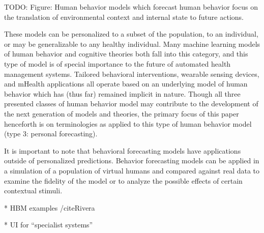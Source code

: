 TODO: Figure: Human behavior models which forecast human behavior focus on the translation of environmental context and internal state to future actions.

These models can be personalized to a subset of the population, to an individual, or may be generalizable to any healthy individual. 
Many machine learning models of human behavior and cognitive theories both fall into this category, and this type of model is of special importance to the future of automated health management systems. 
Tailored behavioral interventions, wearable sensing devices, and mHealth applications all operate based on an underlying model of human behavior which has (thus far) remained implicit in nature. 
Though all three presented classes of human behavior model may contribute to the development of the next generation of models and theories, the primary focus of this paper henceforth is on terminologies as applied to this type of human behavior model (type 3: personal forecasting).

It is important to note that behavioral forecasting models have applications outside of personalized predictions. 
Behavior forecasting models can be applied in a simulation of a population of virtual humans and compared against real data to examine the fidelity of the model or to analyze the possible effects of certain contextual stimuli. 




* HBM examples /cite{Rivera}



* UI for “specialist systems”
